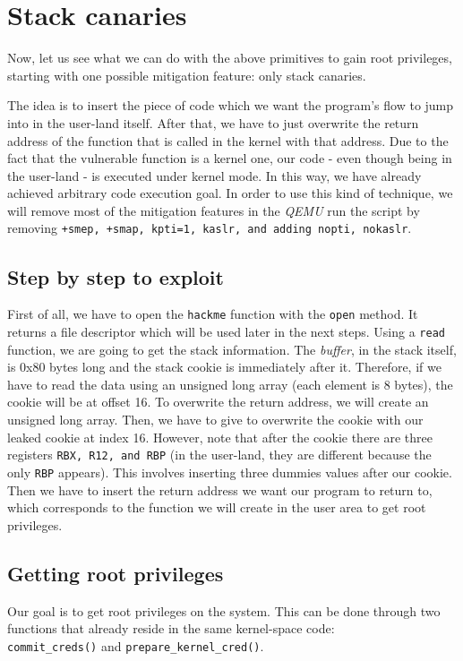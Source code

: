\documentclass{masterthesis}
\begin{document}
\section{Stack canaries}
\label{sect:stackC}
Now, let us see what we can do with the above primitives to gain root privileges, starting with one possible mitigation feature: only stack canaries.

The idea is to insert the piece of code which we want the program’s flow to jump into in the user-land itself. After that, we have to just overwrite the return address of the function that is called in the kernel with that address. Due to the fact that the vulnerable function is a kernel one, our code - even though being in the user-land - is executed under kernel mode. In this way, we have already achieved arbitrary code execution goal.
In order to use this kind of technique, we will remove most of the mitigation features in the \emph{QEMU} run the script by removing \texttt{+smep, +smap, kpti=1, kaslr, and adding nopti, nokaslr}.
\subsection{Step by step to exploit}
First of all, we have to open the \texttt{hackme} function with the \texttt{open} method. It returns a file descriptor which will be used later in the next steps.
Using a \texttt{read} function, we are going to get the stack information.
The \emph{buffer}, in the stack itself, is 0x80 bytes long and the stack cookie is immediately after it. Therefore, if we have to read the data using an unsigned long array (each element is 8 bytes), the cookie will be at offset 16.
To overwrite the return address,  we will create an unsigned long array. Then, we have to give to overwrite the cookie with our leaked cookie at index 16. However, note that after the cookie there are three registers \texttt{RBX, R12, and RBP} (in the user-land, they are different because the only \texttt{RBP} appears).
This involves inserting three dummies values after our cookie. Then we have to insert the return address we want our program to return to, which corresponds to the function we will create in the user area to get root privileges.
\subsection{Getting root privileges}
\label{subsect:get privileges}
Our goal is to get root privileges on the system.
This can be done through two functions that already reside in the same kernel-space code:
\\\texttt{commit\_creds()} and \texttt{prepare\_kernel\_cred()}.
\end{document}
